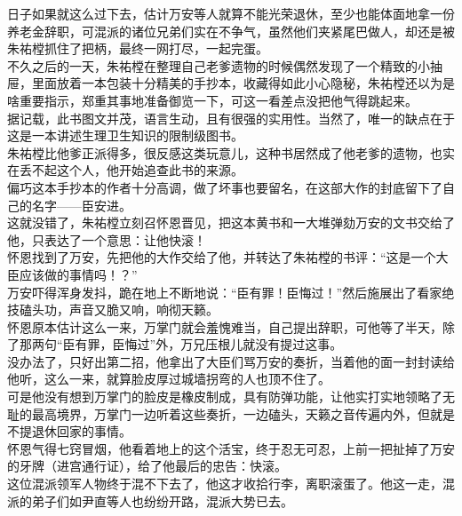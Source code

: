 \begin{multicols}{\theparacolNo}
日子如果就这么过下去，估计万安等人就算不能光荣退休，至少也能体面地拿一份养老金辞职，可混派的诸位兄弟们实在不争气，虽然他们夹紧尾巴做人，却还是被朱祐樘抓住了把柄，最终一网打尽，一起完蛋。\\

不久之后的一天，朱祐樘在整理自己老爹遗物的时候偶然发现了一个精致的小抽屉，里面放着一本包装十分精美的手抄本，收藏得如此小心隐秘，朱祐樘还以为是啥重要指示，郑重其事地准备御览一下，可这一看差点没把他气得跳起来。\\

据记载，此书图文并茂，语言生动，且有很强的实用性。当然了，唯一的缺点在于这是一本讲述生理卫生知识的限制级图书。\\

朱祐樘比他爹正派得多，很反感这类玩意儿，这种书居然成了他老爹的遗物，也实在丢不起这个人，他开始追查此书的来源。\\

偏巧这本手抄本的作者十分高调，做了坏事也要留名，在这部大作的封底留下了自己的名字——臣安进。\\

这就没错了，朱祐樘立刻召怀恩晋见，把这本黄书和一大堆弹劾万安的文书交给了他，只表达了一个意思：让他快滚！\\

怀恩找到了万安，先把他的大作交给了他，并转达了朱祐樘的书评：“这是一个大臣应该做的事情吗！？”\\

万安吓得浑身发抖，跪在地上不断地说：“臣有罪！臣悔过！”然后施展出了看家绝技磕头功，声音又脆又响，响彻天籁。\\

怀恩原本估计这么一来，万掌门就会羞愧难当，自己提出辞职，可他等了半天，除了那两句“臣有罪，臣悔过”外，万兄压根儿就没有提过这事。\\

没办法了，只好出第二招，他拿出了大臣们骂万安的奏折，当着他的面一封封读给他听，这么一来，就算脸皮厚过城墙拐弯的人也顶不住了。\\

可是他没有想到万掌门的脸皮是橡皮制成，具有防弹功能，让他实打实地领略了无耻的最高境界，万掌门一边听着这些奏折，一边磕头，天籁之音传遍内外，但就是不提退休回家的事情。\\

怀恩气得七窍冒烟，他看着地上的这个活宝，终于忍无可忍，上前一把扯掉了万安的牙牌（进宫通行证），给了他最后的忠告：快滚。\\

这位混派领军人物终于混不下去了，他这才收拾行李，离职滚蛋了。他这一走，混派的弟子们如尹直等人也纷纷开路，混派大势已去。\\


\end{multicols}
